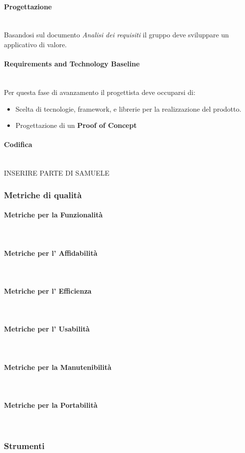 \paragraph{Progettazione}
\mbox{} \\
Basandosi sul documento \textit{Analisi dei requisiti} il gruppo deve sviluppare
un applicativo di valore.

\paragraph{Requirements and Technology Baseline}
\mbox{} \\
Per questa fase di avanzamento il progettista deve occuparsi di:
\begin{itemize}
    \item Scelta di tecnologie, framework, e librerie per la realizzazione del prodotto.
    \item Progettazione di un \textbf{Proof of Concept}
\end{itemize}

\paragraph{Codifica}
\mbox{} \\
INSERIRE PARTE DI SAMUELE

\subsubsection{Metriche di qualità}

\paragraph{Metriche per la Funzionalità}
\mbox{} \\

\paragraph{Metriche per l' Affidabilità}
\mbox{} \\

\paragraph{Metriche per l' Efficienza}
\mbox{} \\

\paragraph{Metriche per l' Usabilità}
\mbox{} \\

\paragraph{Metriche per la Manutenibilità}
\mbox{} \\

\paragraph{Metriche per la Portabilità}
\mbox{} \\

\subsubsection{Strumenti}
